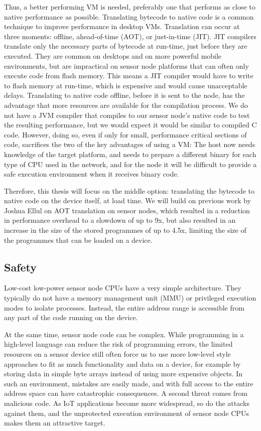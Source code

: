 Thus, a better performing VM is needed, preferably one that performs as close to native performance as possible. Translating bytecode to native code is a common technique to improve performance in desktop VMs. Translation can occur at three moments: offline, ahead-of-time (AOT), or just-in-time (JIT). JIT compilers translate only the necessary parts of bytecode at run-time, just before they are executed. They are common on desktops and on more powerful mobile environments, but are impractical on sensor node platforms that can often only execute code from flash memory. This means a JIT compiler would have to write to flash memory at run-time, which is expensive and would cause unacceptable delays. Translating to native code offline, before it is sent to the node, has the advantage that more resources are available for the compilation process. We do not have a JVM compiler that compiles to our sensor node's native code to test the resulting performance, but we would expect it would be similar to compiled C code. However, doing so, even if only for small, performance critical sections of code, sacrifices the two of the key advantages of using a VM: The host now needs knowledge of the target platform, and needs to prepare a different binary for each type of CPU used in the network, and for the node it will be difficult to provide a safe execution environment when it receives binary code.

Therefore, this thesis will focus on the middle option: translating the bytecode to native code on the device itself, at load time. We will build on previous work by Joshua Ellul \cite{Ellul:2012thesis} on AOT translation on sensor nodes, which resulted in a reduction in performance overhead to a slowdown of up to 9x, but also resulted in an increase in the size of the stored programmes of up to 4.5x, limiting the size of the programmes that can be loaded on a device.

\subsection{Safety}
\label{sec-introduction-safety}
Low-cost low-power sensor node CPUs have a very simple architecture. They typically do not have a memory management unit (MMU) or privileged execution modes to isolate processes. Instead, the entire address range is accessible from any part of the code running on the device.

At the same time, sensor node code can be complex. While programming in a high-level language can reduce the risk of programming errors, the limited resources on a sensor device still often force us to use more low-level style approaches to fit as much functionality and data on a device, for example by storing data in simple byte arrays instead of using more expensive objects. In such an environment, mistakes are easily made, and with full access to the entire address space can have catastrophic consequences. A second threat comes from malicious code. As IoT applications become more widespread, so do the attacks against them, and the unprotected execution environment of sensor node CPUs makes them an attractive target.

